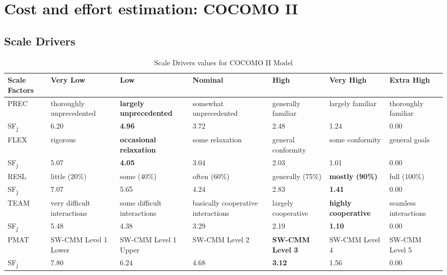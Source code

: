 \section{Cost and effort estimation: COCOMO II}

\subsection{Scale Drivers}
\blindtext
\begin{table}[H]
	\begin{adjustwidth}{-.5in}{-.5in}
		\caption[Scale Drivers values]{Scale Drivers values for COCOMO II Model}
		\label{table:scale_drivers}
		\begin{tabularx}{1.25\textwidth}{| X | X | X | X | X | X | X |}
			\hline
			Scale Factors	&	Very Low	&	Low	&	Nominal	&	High	&	Very High	&	Extra High \\ \hline
			
			PREC	&	thoroughly unprecedented	&	\textbf{largely unprecedented}	&	somewhat unprecedented	&	generally familiar	&	largely familiar	&	thoroughly familiar \\
			SF\textsubscript{j}	&	6.20	&	\textbf{4.96}	&	3.72	&	2.48	&	1.24	&	0.00 \\ \hline
			
			FLEX	&	rigorous	&	\textbf{occasional relaxation}	&	some relaxation	&	general conformity	&	some conformity	&	general goals \\
			SF\textsubscript{j}	&	5.07	&	\textbf{4.05}	&	3.04	&	2.03	&	1.01	&	0.00 \\ \hline
			
			RESL	&	little (20\%)	&	some (40\%)	&	often (60\%)	&	generally (75\%)	&	\textbf{mostly (90\%)	}&	full (100\%) \\
			SF\textsubscript{j}	&	7.07	&	5.65	&	4.24	&	2.83	&	\textbf{1.41}	&	0.00 \\ \hline
			
			TEAM	&	very difficult interactions	&	some difficult interactions	&	basically cooperative interactions	&	largely cooperative	&	\textbf{highly cooperative}	&	seamless interactions \\
			SF\textsubscript{j}	&	5.48	&	4.38&	3.29	&	2.19	&	\textbf{1.10}	&	0.00 \\ \hline
			
			PMAT	&	SW-CMM Level 1 Lower	&	SW-CMM Level 1 Upper	&	SW-CMM Level 2	&	\textbf{SW-CMM Level 3}	&	SW-CMM Level 4	&	SW-CMM Level 5 \\
			SF\textsubscript{j}	&	7.80	&	6.24	&	4.68	&	\textbf{3.12}	&	1.56	&	0.00 \\ \hline
		\end{tabularx}
	\end{adjustwidth}
\end{table}

